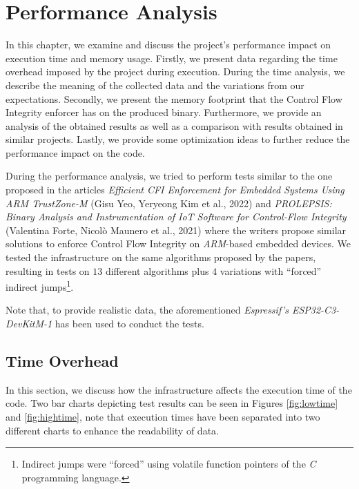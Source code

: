 \chapter{Performance Analysis}
\label{cha:pa}

In this chapter, we examine and discuss the project's performance impact on execution
time and memory usage. Firstly, we present data regarding the time overhead imposed
by the project during execution. During the time analysis, we describe the meaning
of the collected data and the variations from our expectations. Secondly, we present
the memory footprint that the Control Flow Integrity enforcer has on the produced
binary. Furthermore, we provide an analysis of the obtained results as well as a
comparison with results obtained in similar projects. Lastly, we provide some optimization
ideas to further reduce the performance impact on the code.

During the performance analysis, we tried to perform tests similar to the one
proposed in the articles \textit{Efficient CFI Enforcement for Embedded Systems
Using ARM TrustZone-M} (Gisu Yeo, Yeryeong Kim et al., 2022)\cite{article1} and \textit{PROLEPSIS:
Binary Analysis and Instrumentation of IoT Software for Control-Flow Integrity}
(Valentina Forte, Nicol\`{o} Maunero et al., 2021)\cite{article2} where the
writers propose similar solutions to enforce Control Flow Integrity on \textit{ARM}-based
embedded devices. We tested the infrastructure on the same algorithms proposed
by the papers, resulting in tests on $13$ different algorithms plus $4$ variations
with ``forced'' indirect jumps\footnote{Indirect jumps were ``forced'' using
volatile function pointers of the \textit{C} programming language.}.

Note that, to provide realistic data, the aforementioned \textit{Espressif's
ESP32-C3-DevKitM-1} has been used to conduct the tests.

\section{Time Overhead}
\label{sec:pa_time}

In this section, we discuss how the infrastructure affects the execution time of
the code. Two bar charts depicting test results can be seen in Figures
\ref{fig:lowtime} and \ref{fig:hightime}, note that execution times have been separated
into two different charts to enhance the readability of data.

